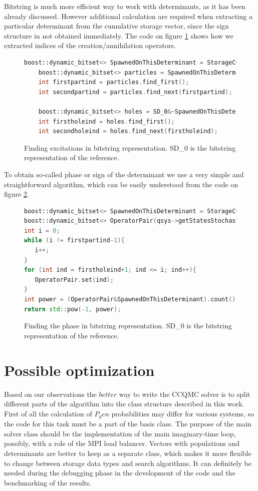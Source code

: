 \documentclass[twoside,english]{uiofysmaster}
\begin{document}
Bitstring is much more efficient way to work with determinants, as it has been already discussed. However additional calculation are required when extracting a particular determinant from the cumulative storage vector, since the sign structure in not obtained immediately. The code on figure \ref{fig:CCQMCgetindex} shows how we extracted indices of the creation/annihilation operators.

\begin{figure}[h!]
	\begin{lstlisting}[language=C++]
	boost::dynamic_bitset<> SpawnedOnThisDeterminant = StorageCumulativeDeterminants.at(ExcitorIndex);
	boost::dynamic_bitset<> particles = SpawnedOnThisDeterminant&~SD_0;
	int firstpartind = particles.find_first();
	int secondpartind = particles.find_next(firstpartind);
	
	boost::dynamic_bitset<> holes = SD_0&~SpawnedOnThisDeterminant;
	int firstholeind = holes.find_first();
	int secondholeind = holes.find_next(firstholeind);
	\end{lstlisting}
	\caption{Finding excitations in bitstring representation. SD_0 is the bitstring representation of the reference.}\label{fig:CCQMCgetindex}
\end{figure}

To obtain so-called phase or sign of the determinant we use a very simple and straightforward algorithm, which can be easily understood from the code on figure \ref{fig:CCQMCphase}.


\begin{figure}[h!]
\begin{lstlisting}[language=C++]
boost::dynamic_bitset<> SpawnedOnThisDeterminant = StorageCumulativeDeterminants.at(ExcitorIndex);
boost::dynamic_bitset<> OperatorPair(qsys->getStatesStochastic());
int i = 0;
while (i != firstpartind-1){
   i++;
}
for (int ind = firstholeind+1; ind <= i; ind++){
   OperatorPair.set(ind);
}
int power = (OperatorPair&SpawnedOnThisDeterminant).count();
return std::pow(-1, power);
\end{lstlisting}
\caption{Finding the phase in bitstring representation. SD_0 is the bitstring representation of the reference.}\label{fig:CCQMCphase}
\end{figure}



\section{Possible optimization}
Based on our observations the $better$ way to write the CCQMC solver
is to split different parts of the algorithm into the class structure
described in this work.  First of all the calculation of $P_gen$
probabilities may differ for various systems, so the code for this
task must be a part of the basis class.  The purpose of the main
solver class should be the implementation of the main imaginary-time loop,
possibly, with a role of the MPI load balancer.  Vectors with
populations and determinants are better to keep as a separate class,
which makes it more flexible to change between storage data types and
search algorithms. It can definitely be needed during the debugging phase
in the development of the code and the benchmarking of the results.
\end{document}
